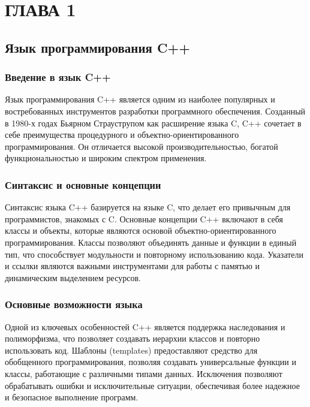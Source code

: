 \chapter{\label{ch:ch01}ГЛАВА 1} %

\section{\label{sec:ch01/sec01}Язык программирования C++}

\subsection{\label{subsec:ch01/sec01/sub01}Введение в язык C++}
Язык программирования C++ является одним из наиболее популярных и востребованных инструментов разработки программного обеспечения. Созданный в 1980-х годах Бьярном Страуструпом как расширение языка C, C++ сочетает в себе преимущества процедурного и объектно-ориентированного программирования. Он отличается высокой производительностью, богатой функциональностью и широким спектром применения.

\subsection{\label{subsec:ch01/sec01/sub02}Синтаксис и основные концепции}
Синтаксис языка C++ базируется на языке C, что делает его привычным для программистов, знакомых с C. Основные концепции C++ включают в себя классы и объекты, которые являются основой объектно-ориентированного программирования. Классы позволяют объединять данные и функции в единый тип, что способствует модульности и повторному использованию кода. Указатели и ссылки являются важными инструментами для работы с памятью и динамическим выделением ресурсов.

\subsection{\label{subsec:ch01/sec01/sub03}Основные возможности языка}
Одной из ключевых особенностей C++ является поддержка наследования и полиморфизма, что позволяет создавать иерархии классов и повторно использовать код. Шаблоны (templates) предоставляют средство для обобщенного программирования, позволяя создавать универсальные функции и классы, работающие с различными типами данных. Исключения позволяют обрабатывать ошибки и исключительные ситуации, обеспечивая более надежное и безопасное выполнение программ.

